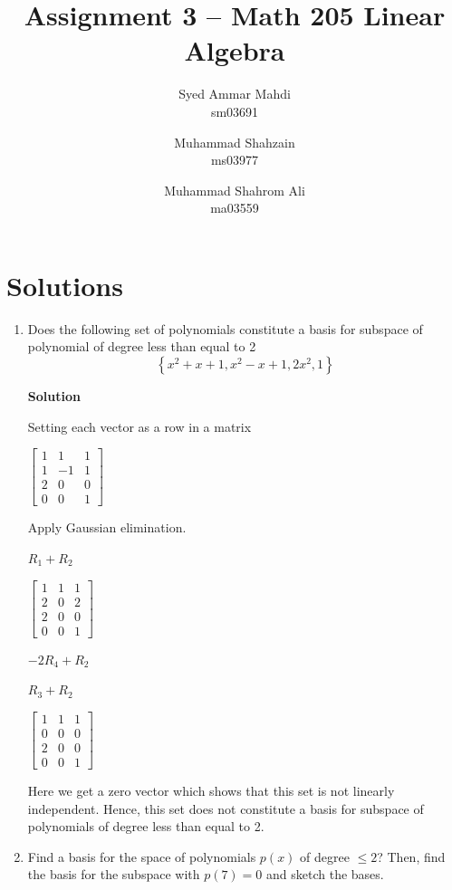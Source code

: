\documentclass[a4paper, 11pt]{article}
\title{Assignment 3 -- Math 205 Linear Algebra}
\author{Syed Ammar Mahdi \\sm03691 \and Muhammad Shahzain \\ms03977 \and Muhammad Shahrom Ali \\ma03559}
\begin{document}
\setlength{\parskip}{10pt} %
\setlength{\parindent}{0pt}
\maketitle

\section*{Solutions}
\begin{enumerate} 

\item Does the following set of polynomials constitute a basis for subspace of polynomial of degree less than equal to 2 \[
\left\{x^2 + x + 1, x^2 - x + 1, 2x^2, 1 \right\}
\]

\textbf{Solution}


Setting each vector as a row in a matrix

$
\begin{bmatrix} 
1 & 1 & 1 \\ 1 & -1 & 1 \\ 
2 & 0 & 0 \\ 0 & 0 & 1
\end{bmatrix}
$

Apply Gaussian elimination.

$R_1 + R_2$

$
\begin{bmatrix} 
1 & 1 & 1 \\ 2 & 0 & 2 \\ 
2 & 0 & 0 \\ 0 & 0 & 1
\end{bmatrix}
$

$-2R_4 + R_2$

$R_3 + R_2$

$
\begin{bmatrix} 
1 & 1 & 1 \\ 0 & 0 & 0 \\ 
2 & 0 & 0 \\ 0 & 0 & 1
\end{bmatrix}
$

Here we get a zero vector which shows that this set is not linearly independent. Hence, this set does not constitute a basis for subspace of polynomials of degree less than equal to 2. 

\item Find a basis for the space of polynomials $p(x)$ of degree $\leq 2$? Then, find the basis for the subspace with $p(7) = 0$ and sketch the bases.


\end{enumerate}
\end{document}
